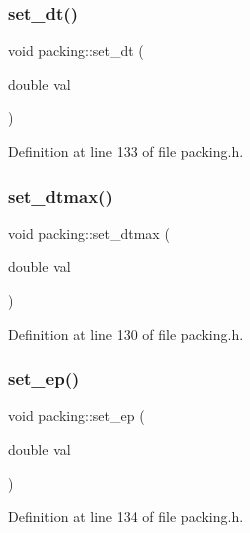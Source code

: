 \subsubsection{\texorpdfstring{set\+\_\+dt()}{set\_dt()}}
{\footnotesize\ttfamily void packing\+::set\+\_\+dt (\begin{DoxyParamCaption}\item[{double}]{val }\end{DoxyParamCaption})\hspace{0.3cm}{\ttfamily [inline]}}



Definition at line 133 of file packing.\+h.

\mbox{\label{classpacking_a5dc1a61832b80ca41be310784cec6008}} 
\subsubsection{\texorpdfstring{set\+\_\+dtmax()}{set\_dtmax()}}
{\footnotesize\ttfamily void packing\+::set\+\_\+dtmax (\begin{DoxyParamCaption}\item[{double}]{val }\end{DoxyParamCaption})\hspace{0.3cm}{\ttfamily [inline]}}



Definition at line 130 of file packing.\+h.

\mbox{\label{classpacking_a3371ec250e3165eae9231914a7e7fa88}} 
\subsubsection{\texorpdfstring{set\+\_\+ep()}{set\_ep()}}
{\footnotesize\ttfamily void packing\+::set\+\_\+ep (\begin{DoxyParamCaption}\item[{double}]{val }\end{DoxyParamCaption})\hspace{0.3cm}{\ttfamily [inline]}}



Definition at line 134 of file packing.\+h.

\mbox{\label{classpacking_af80acfd978be8d09fed22d40459bb3fc}} 
